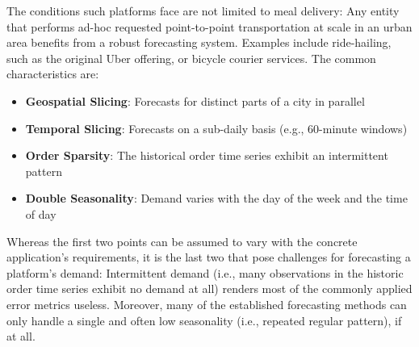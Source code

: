 The conditions such platforms face are not limited to meal delivery:
    Any entity that performs ad-hoc requested point-to-point transportation at
    scale in an urban area benefits from a robust forecasting system.
Examples include ride-hailing, such as the original Uber offering, or bicycle
    courier services.
The common characteristics are:
\begin{itemize}
\item \textbf{Geospatial Slicing}:
    Forecasts for distinct parts of a city in parallel
\item \textbf{Temporal Slicing}:
    Forecasts on a sub-daily basis (e.g., 60-minute windows)
\item \textbf{Order Sparsity}:
    The historical order time series exhibit an intermittent pattern
\item \textbf{Double Seasonality}:
    Demand varies with the day of the week and the time of day
\end{itemize}
Whereas the first two points can be assumed to vary with the concrete
	application's requirements, it is the last two that pose challenges for
	forecasting a platform's demand:
Intermittent demand (i.e., many observations in the historic order time series
    exhibit no demand at all) renders most of the commonly applied error
    metrics useless.
Moreover, many of the established forecasting methods can only handle a single
    and often low seasonality (i.e., repeated regular pattern), if at all.

